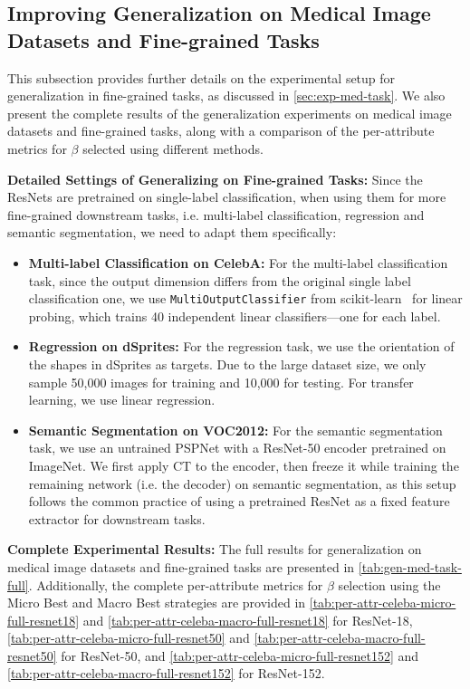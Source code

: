 \subsection{Improving Generalization on Medical Image Datasets and Fine-grained Tasks}\label{app:exp-med-task}
This subsection provides further details on the experimental setup for generalization in fine-grained tasks, as discussed in \cref{sec:exp-med-task}. We also present the complete results of the generalization experiments on medical image datasets and fine-grained tasks, along with a comparison of the per-attribute metrics for $\beta$ selected using different methods.

\textbf{Detailed Settings of Generalizing on Fine-grained Tasks:} Since the ResNets are pretrained on single-label classification, when using them for more fine-grained downstream tasks, i.e. multi-label classification, regression and semantic segmentation, we need to adapt them specifically:
\begin{itemize}
    \item \textbf{Multi-label Classification on CelebA:} For the multi-label classification task, since the output dimension differs from the original single label classification one, we use \texttt{MultiOutputClassifier} from scikit-learn~\cite{buitinck2013sklearn} for linear probing, which trains 40 independent linear classifiers—one for each label.
    \item \textbf{Regression on dSprites:} For the regression task, we use the orientation of the shapes in dSprites as targets. Due to the large dataset size, we only sample 50,000 images for training and 10,000 for testing. For transfer learning, we use linear regression.
    \item \textbf{Semantic Segmentation on VOC2012:} For the semantic segmentation task, we use an untrained PSPNet with a ResNet-50 encoder pretrained on ImageNet. We first apply CT to the encoder, then freeze it while training the remaining network (i.e. the decoder) on semantic segmentation, as this setup follows the common practice of using a pretrained ResNet as a fixed feature extractor for downstream tasks. 
\end{itemize}

\textbf{Complete Experimental Results:} The full results for generalization on medical image datasets and fine-grained tasks are presented in \cref{tab:gen-med-task-full}. Additionally, the complete per-attribute metrics for $\beta$ selection using the Micro Best and Macro Best strategies are provided in \cref{tab:per-attr-celeba-micro-full-resnet18} and \cref{tab:per-attr-celeba-macro-full-resnet18} for ResNet-18, \cref{tab:per-attr-celeba-micro-full-resnet50} and \cref{tab:per-attr-celeba-macro-full-resnet50} for ResNet-50, and \cref{tab:per-attr-celeba-micro-full-resnet152} and \cref{tab:per-attr-celeba-macro-full-resnet152} for ResNet-152.  

